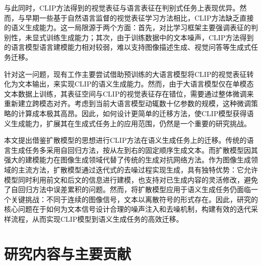 与此同时，CLIP方法得到的视觉表征与语言表征在判别式任务上表现优异。然而，与早期一些基于自然语言监督的视觉表征学习方法\cite{desai2021virtex}相比，CLIP方法缺乏直接的语义生成能力。这一局限源于两个方面：首先，对比学习框架主要强调表征的判别性，未显式训练生成能力；其次，由于训练数据中的文本噪声，CLIP方法得到的语言模型语言建模能力相对较弱，难以支持图像描述生成、视觉问答等生成式任务迁移。

针对这一问题，现有工作主要尝试借助预训练的大语言模型将CLIP的视觉表征转化为文本输出，来实现CLIP的语义生成能力。然而，由于大语言模型仅在单模态文本数据上训练，其表征空间与CLIP的视觉表征存在错位，需要通过整体微调来重新建立跨模态对齐。考虑到当前大语言模型动辄数十亿参数的规模，这种微调策略的计算成本极其高昂。因此，如何设计更简单的迁移方法，使CLIP模型获得语义生成能力，扩展其在生成式任务上的应用范围，仍然是一个重要的研究挑战。

本文提出借鉴扩散模型的思想进行CLIP方法在语义生成任务上的迁移。传统的语言生成任务多采用自回归方法\cite{gpt2}，按从左到右的固定顺序生成文本。而扩散模型\cite{ddim,ddpm}因其强大的建模能力在图像生成领域代替了传统的生成对抗网络方法。作为图像生成领域的主流方法，扩散模型通过迭代式的去噪过程实现生成，具有独特优势：它允许模型同时利用前文和后文的信息进行建模，也支持对已生成内容的灵活修改，避免了自回归方法中误差累积的问题。然而，将扩散模型应用于语义生成任务仍面临一个关键挑战：不同于连续的图像信号，文本以离散符号的形式存在。因此，研究的核心问题在于如何为文本信号设计合理的噪声注入和去噪机制，构建有效的迭代采样流程，从而实现CLIP模型到语义生成任务的高效迁移。


\section{研究内容与主要贡献}

